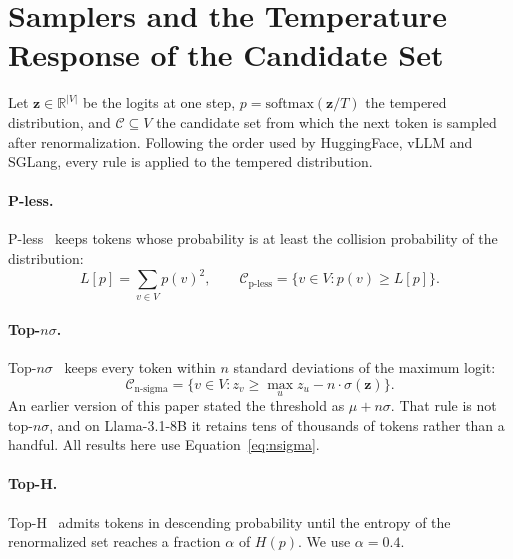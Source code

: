 \documentclass{article}
\begin{document}
\section{Samplers and the Temperature Response of the Candidate Set}
\label{sec:method}

Let $\mathbf{z}\in\mathbb{R}^{|V|}$ be the logits at one step, $p=\mathrm{softmax}(\mathbf{z}/T)$ the tempered distribution, and $\mathcal{C}\subseteq V$ the candidate set from which the next token is sampled after renormalization. Following the order used by HuggingFace, vLLM and SGLang, every rule is applied to the tempered distribution.

\paragraph{P-less.}
P-less~\citep{tan2025pless} keeps tokens whose probability is at least the collision probability of the distribution:
\begin{equation}
L[p] = \sum_{v \in V} p(v)^2,
\qquad
\mathcal{C}_{\text{p-less}} = \{v \in V : p(v) \ge L[p]\}.
\label{eq:pless}
\end{equation}

\paragraph{Top-$n\sigma$.}
Top-$n\sigma$~\citep{tang2024topnsigma} keeps every token within $n$ standard deviations of the maximum logit:
\begin{equation}
\mathcal{C}_{\text{n-sigma}} = \{v \in V : z_v \ge \max_{u} z_u - n \cdot \sigma(\mathbf{z})\}.
\label{eq:nsigma}
\end{equation}
An earlier version of this paper stated the threshold as $\mu + n\sigma$. That rule is not top-$n\sigma$, and on Llama-3.1-8B it retains tens of thousands of tokens rather than a handful. All results here use Equation~\ref{eq:nsigma}.

\paragraph{Top-H.}
Top-H~\citep{baghaei2025toph} admits tokens in descending probability until the entropy of the renormalized set reaches a fraction $\alpha$ of $H(p)$. We use $\alpha{=}0.4$.
\end{document}

